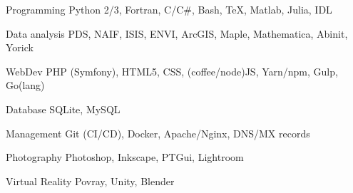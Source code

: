 
\begin{cvskills}

	\cvskill
	{Programming}
    {Python 2/3, Fortran, C/C\#, Bash, \TeX, Matlab, Julia, IDL}

	\cvskill
	{Data analysis}
    {PDS, NAIF, ISIS, ENVI, ArcGIS, Maple, Mathematica, Abinit, Yorick}

	\cvskill
    {WebDev}
    {PHP (Symfony), HTML5, CSS, (coffee/node)JS, Yarn/npm, Gulp, Go(lang)}

	\cvskill
    {Database}
    {SQLite, MySQL}

	\cvskill
    {Management}
    {Git (CI/CD), Docker, Apache/Nginx, DNS/MX records}

	\cvskill
    {Photography}
    {Photoshop, Inkscape, PTGui, Lightroom}

    \cvskill
    {Virtual Reality}
    {Povray, Unity, Blender}

\end{cvskills}
